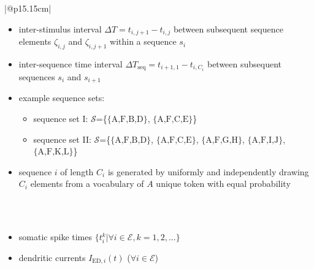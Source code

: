 \documentclass[10pt,a4paper,twoside,american]{article}
\newcommand{\seq}[1]{\ensuremath{\{\text{#1}\}}}
\begin{document}
\begin{table}
\begin{tabular}{|@{\hspace*{1mm}}p{15.15cm}|}
\begin{itemize}
        \item inter-stimulus interval $\Delta{}T=t_{i,j+1}-t_{i,j}$ between subsequent sequence elements $\zeta_{i,j}$ and $\zeta_{i,j+1}$ within a sequence $s_i$
        \item inter-sequence time interval $\Delta{}T_\text{seq}=t_{i+1,1}-t_{i,C_i}$ between subsequent sequences $s_i$ and $s_{i+1}$
        \item example sequence sets: 
          \begin{itemize}
          \item sequence set I: $\mathcal{S}$=\{\seq{A,F,B,D}, \seq{A,F,C,E}\}
          \item sequence set II: $\mathcal{S}$=\{\seq{A,F,B,D}, \seq{A,F,C,E}, \seq{A,F,G,H}, \seq{A,F,I,J}, \seq{A,F,K,L}\}
          \end{itemize} 
        \item sequence $i$ of length $C_i$ is generated by uniformly and independently drawing $C_i$ elements from a vocabulary of $A$ unique token with equal probability
    \end{itemize}
  \\
\hline 
{} \\
  \hline
    \begin{itemize}
    \item somatic spike times $\{t_i^k | \forall{}i\in\mathcal{E},k=1,2,\ldots \}$
    \item dendritic currents $I_{\text{ED},i}(t)$ ($\forall{}i\in\mathcal{E}$)
    \end{itemize} \\
  \hline
\end{tabular}
  \caption{Description of the input and the output. Parameter values are given in \cref{tab:Model-parameters}.}
  \label{tab:Model-description-inout}
\end{table}
\end{document}
